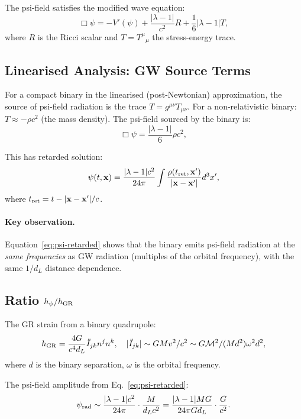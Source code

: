 \documentclass[11pt]{article}
\theoremstyle{definition}
\theoremstyle{remark}
\newcommand{\lambdaone}{|\lambda-1|}
\begin{document}
The psi-field satisfies the modified wave equation:
\begin{equation}
\Box\psi = -V'(\psi) + \frac{\lambdaone}{c^2} R + \frac{1}{6}\lambdaone T,
\label{eq:psi-wave-eq}
\end{equation}
where $R$ is the Ricci scalar and $T = T^\mu{}_\mu$ the stress-energy trace.

\subsection{Linearised Analysis: GW Source Terms}

For a compact binary in the linearised (post-Newtonian) approximation,
the source of psi-field radiation is the trace $T = g^{\mu\nu}T_{\mu\nu}$.
For a non-relativistic binary: $T \approx -\rho c^2$ (the mass density).
The psi-field sourced by the binary is:
\begin{equation}
\Box\psi = \frac{\lambdaone}{6} \rho c^2,
\label{eq:psi-source-binary}
\end{equation}

This has retarded solution:
\begin{equation}
\psi(t, \mathbf{x}) = \frac{\lambdaone c^2}{24\pi}
\int \frac{\rho(t_{\rm ret}, \mathbf{x}')}{|\mathbf{x}-\mathbf{x}'|} d^3x',
\label{eq:psi-retarded}
\end{equation}
where $t_{\rm ret} = t - |\mathbf{x}-\mathbf{x}'|/c$.

\paragraph{Key observation.}
Equation~\eqref{eq:psi-retarded} shows that the binary emits psi-field
radiation at the \emph{same frequencies} as GW radiation (multiples of
the orbital frequency), with the same $1/d_L$ distance dependence.

\subsection{Ratio $h_\psi / h_{\rm GR}$}

The GR strain from a binary quadrupole:
\begin{equation}
h_{\rm GR} = \frac{4G}{c^4 d_L} \ddot{I}_{jk} n^j n^k,
\quad
|\ddot{I}_{jk}| \sim G M v^2 / c^2 \sim G\mathcal{M}^2/(M d^2) \omega^2 d^2,
\label{eq:hGR}
\end{equation}
where $d$ is the binary separation, $\omega$ is the orbital frequency.

The psi-field amplitude from Eq.~\eqref{eq:psi-retarded}:
\begin{equation}
\psi_{\rm rad} \sim \frac{\lambdaone c^2}{24\pi} \cdot \frac{M}{d_L c^2}
= \frac{\lambdaone M G}{24\pi G d_L} \cdot \frac{G}{c^2}.
\label{eq:psi-rad}
\end{equation}
\end{document}
